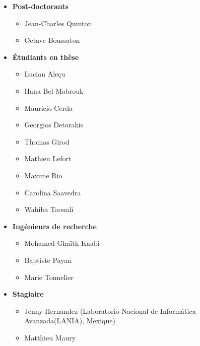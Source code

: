 \begin{itemize}
   \item \textbf{Post-doctorants}
      \begin{itemize}
         \item  Jean-Charles Quinton
         \item  Octave Boussaton
      \end{itemize}
   \item \textbf{Étudiants en thèse}
      \begin{itemize}
         \item Lucian Aleçu
         \item Hana Bel Mabrouk
         \item Mauricio Cerda
         \item Georgios Detorakis
         \item Thomas Girod
         \item Mathieu Lefort
         \item Maxime Rio
         \item Carolina Saavedra
         \item Wahiba Taouali
      \end{itemize}
   \item \textbf{Ingénieurs de recherche}
      \begin{itemize}
         \item Mohamed Ghaïth Kaabi
         \item Baptiste Payan
         \item Marie Tonnelier
      \end{itemize}
   \item \textbf{Stagiaire}
      \begin{itemize}
         \item Jenny Hernandez (Laboratorio Nacional de Informática Avanzada(LANIA), Mexique)
         \item Matthieu Maury
      \end{itemize}
\end{itemize}



